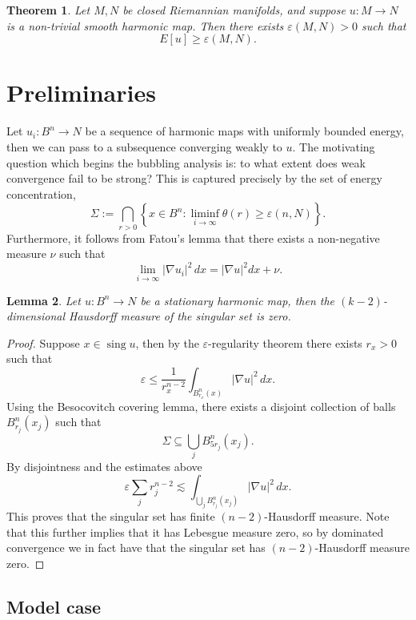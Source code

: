 \documentclass[reqno]{amsart}
\newtheorem{theorem}{Theorem}
\newtheorem{lemma}[theorem]{Lemma}
\theoremstyle{definition}
\theoremstyle{remark}
\renewcommand{\epsilon}{\varepsilon}
\begin{document}
\begin{theorem}
	Let $M, N$ be closed Riemannian manifolds, and suppose $u: M \to N$ is a non-trivial smooth harmonic map. Then there exists $\epsilon (M, N) > 0$ such that
		\[ E[u] \geq \epsilon (M , N). \]
\end{theorem}



\section{Preliminaries}


Let $u_i : B^n \to N$ be a sequence of harmonic maps with uniformly bounded energy, then we can pass to a subsequence converging weakly to $u$. The motivating question which begins the bubbling analysis is: to what extent does weak convergence fail to be strong? This is captured precisely by the set of energy concentration, 
	\[ \Sigma := \bigcap_{r > 0} \left\{ x \in B^n : \liminf_{i \to \infty} \theta(r) \geq \epsilon(n, N) \right\}. \]
Furthermore, it follows from Fatou's lemma that there exists a non-negative measure $\nu$ such that
	\[ \lim_{i \to \infty} |\nabla u_i|^2 \, dx = |\nabla u|^2 dx + \nu. \]	

	
\begin{lemma}
	Let $u: B^n \to N$ be a stationary harmonic map, then the $(k - 2)$-dimensional Hausdorff measure of the singular set is zero. 
\end{lemma}

\begin{proof}
	Suppose $x \in \operatorname{sing} u$, then by the $\epsilon$-regularity theorem there exists $r_x > 0$ such that
		\[ \epsilon \leq \frac{1}{r_x^{n - 2}} \int_{B^n_{r_x} (x)} |\nabla u|^2 \, dx.  \]
	Using the Besocovitch covering lemma, there exists a disjoint collection of balls $B^n_{r_j} (x_j)$ such that
		\[ \Sigma \subseteq \bigcup_{j} B^n_{5r_j} (x_j) .\]
	By disjointness and the estimates above
		\[ \epsilon \sum_j r_j^{n - 2} \lesssim  \int_{\bigcup_j B^n_{r_j} (x_j)} |\nabla u|^2 \, dx . \]		
	This proves that the singular set has finite $(n - 2)$-Hausdorff measure. Note that this further implies that it has Lebesgue measure zero, so by dominated convergence we in fact have that the singular set has $(n - 2)$-Hausdorff measure zero. 
\end{proof}

\subsection{Model case}
\end{document}
